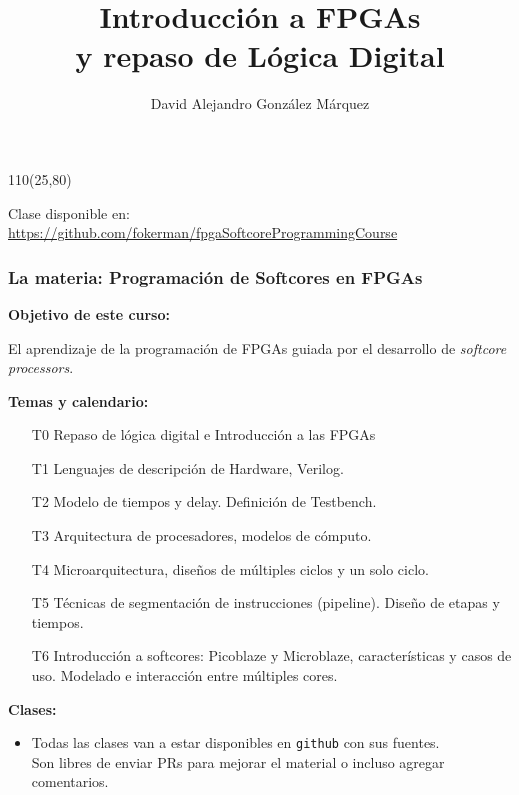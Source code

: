 \documentclass[aspectratio=169]{beamer}
\title{\Huge Introducción a FPGAs\\ \large y repaso de Lógica Digital}
\author{David Alejandro González Márquez}
\date{}
\begin{document}
\begin{frame}[plain]
    \titlepage
    \begin{textblock}{110}(25,80)
    \begin{tcolorbox}[size=small,width=\textwidth,colback={gray!30},title={}]
    \begin{center}
     \scriptsize Clase disponible en: \url{https://github.com/fokerman/fpgaSoftcoreProgrammingCourse}
    \end{center}
    \end{tcolorbox}
    \end{textblock}
\end{frame}

\begin{frame}[fragile]
    \frametitle{\large La materia: \Large Programación de Softcores en FPGAs}
    \textbf{Objetivo de este curso:}\\
    \vspace{-0.4cm}
    \begin{center}
    \textcolor{verdeuca}{El aprendizaje de la programación de FPGAs guiada por el desarrollo de \emph{softcore processors}.}\\
    \end{center}
    \pause
    \textbf{Temas y calendario:}\\
    \vspace{-0.2cm}
    \begin{itemize}
    \setlength\itemsep{0.0cm}
     \item[T0] Repaso de \textcolor{naranjauca}{lógica digital} e Introducción a las FPGAs
     \item[T1] Lenguajes de descripción de Hardware, \textcolor{naranjauca}{Verilog}.
     \item[T2] Modelo de \textcolor{naranjauca}{tiempos} y delay. Definición de \textcolor{naranjauca}{Testbench}.
     \pause
     \item[T3] \textcolor{naranjauca}{Arquitectura} de procesadores, modelos de cómputo.
     \item[T4] \textcolor{naranjauca}{Microarquitectura}, diseños de múltiples ciclos y un solo ciclo.
     \item[T5] Técnicas de segmentación de instrucciones (\textcolor{naranjauca}{pipeline}). Diseño de etapas y tiempos.
     \pause
     \item[T6] Introducción a \textcolor{naranjauca}{softcores}: Picoblaze y Microblaze, características y casos de uso. Modelado e interacción entre múltiples cores.
    \end{itemize}
    \pause
    \textbf{Clases:}\\
    \vspace{-0.2cm}
    \begin{itemize}
    \item \textcolor{verdeuca}{
    Todas las clases van a estar disponibles en \texttt{github} con sus fuentes.\\
    Son libres de enviar PRs para mejorar el material o incluso agregar comentarios.\\}
    \end{itemize}
\end{frame}
\end{document}
